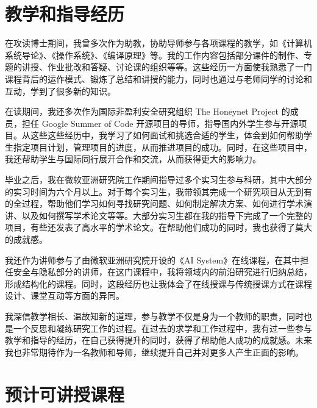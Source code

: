 \documentclass[12pt]{article}
\begin{document}


\section{教学和指导经历}

在攻读博士期间，我曾多次作为助教，协助导师参与各项课程的教学，如《计算机系统导论》、《操作系统》、《编译原理》等。我的工作内容包括部分课件的制作、专题的讲授、作业批改和答疑、讨论课的组织等等。这些经历一方面使我熟悉了一门课程背后的运作模式、锻炼了总结和讲授的能力，同时也通过与老师同学的讨论和互动，学到了很多新的知识。

在读期间，我还多次作为国际非盈利安全研究组织 The Honeynet Project 的成员，担任 Google Summer of Code 开源项目的导师，指导国内外学生参与开源项目。从这些这些经历中，我学习了如何面试和挑选合适的学生，体会到如何帮助学生指定项目计划，管理项目的进度，从而推进项目的成功。同时，在这些项目中，我还帮助学生与国际同行展开合作和交流，从而获得更大的影响力。

毕业之后，我在微软亚洲研究院工作期间指导过多个实习生参与科研，其中大部分的实习时间为六个月以上。对于每个实习生，我带领其完成一个研究项目从无到有的全过程，帮助他们学习如何寻找研究问题、如何制定解决方案、如何进行学术演讲、以及如何撰写学术论文等等。大部分实习生都在我的指导下完成了一个完整的项目，有些还发表了高水平的学术论文。在帮助他们成功的同时，我也获得了莫大的成就感。

我还作为讲师参与了由微软亚洲研究院开设的《AI System》在线课程，在其中担任安全与隐私部分的讲师，在这门课程中，我将领域内的前沿研究进行归纳总结，形成结构化的课程。同时，这段经历也让我体会了在线授课与传统授课方式在课程设计、课堂互动等方面的异同。

我深信教学相长、温故知新的道理，参与教学不仅是身为一个教师的职责，同时也是一个反思和凝练研究工作的过程。在过去的求学和工作过程中，我有过一些参与教学和指导的经历，在自己获得提升的同时，获得了帮助他人成功的成就感。未来我也非常期待作为一名教师和导师，继续提升自己并对更多人产生正面的影响。


\section{预计可讲授课程}
\end{document}
